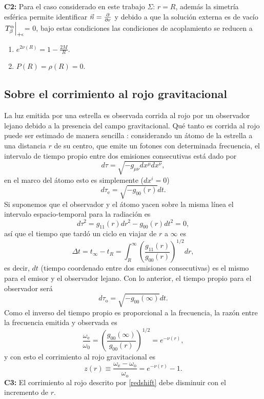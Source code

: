  \textbf{C2:} Para el caso considerado en este trabajo $\Sigma:\,r=R$, además la simetría esférica permite identificar $\vec{n}=\pdv{r}$ y debido a que la solución externa es de vacío $\eval{T^{\alpha}_{\beta}}_{+\epsilon}$= 0, bajo estas condiciones las condiciones de acoplamiento se reducen a
 \begin{enumerate}[leftmargin=2cm]
     \item $e ^ {  2 \nu(R) } =  1 - \frac { 2 M } { R }$.
    \item $P(R)=\rho(R)=0$.
 \end{enumerate}


\subsection*{ Sobre el corrimiento al rojo gravitacional}
La luz emitida por una estrella es observada corrida al rojo por un observador lejano debido a la presencia del campo gravitacional. Qué tanto es corrida al rojo puede ser estimado de manera sencilla \cite{Glendenning2000}: considerando un átomo de la estrella a una distancia $r$ de su centro, que emite un fotones con determinada frecuencia, el intervalo de tiempo propio entre dos emisiones consecutivas está dado por
\begin{equation}
d \tau=\sqrt{-g_{\mu \nu} d x^{\mu} d x^{\nu}},
\end{equation}
en el marco del átomo esto es simplemente ($dx^i=0$)
\begin{equation}
d \tau_{\mathrm{e}}=\sqrt{-g_{00}(r)} d t.
\end{equation}
Si suponemos que el observador y el átomo yacen sobre la misma línea el intervalo espacio-temporal para la radiación es
\begin{equation}
d \tau^{2}=g_{11}(r) d r^{2} - g_{00}(r) d t^{2} = 0,
\end{equation}
así que el tiempo que tardó un ciclo en viajar de $r$ a $\infty$ es
\begin{equation}
\Delta t=t_{\infty}-t_{R}=\int_{R}^{\infty}\left(\frac{g_{11}(r)}{g_{00}(r)}\right)^{1 / 2} d r,
\end{equation}
es decir, $dt$ (tiempo coordenado entre dos emisiones consecutivas) es el mismo para el emisor y el observador lejano. Con lo anterior, el tiempo propio para el observador será
\begin{equation}
d \tau_{\mathrm{o}}=\sqrt{-g_{00}(\infty)} d t.
\end{equation}
Como el inverso del tiempo propio es proporcional a la frecuencia, la razón entre la frecuencia emitida y observada es
\begin{equation}
\frac{\omega_{\mathrm{e}}}{\omega_{\mathrm{0}}}=\left(\frac{g_{00}(\infty)}{g_{00}(r)}\right)^{1 / 2}=e^{-\nu(r)},
\end{equation}
y con esto el corrimiento al rojo gravitacional es
\begin{equation}
    z(r)\equiv \frac{\omega_{\mathrm{e}}-\omega_{\mathrm{o}}}{\omega_{\mathrm{o}}}  = e^{-\nu(r)}-1.
    \label{redshift}
\end{equation}
\textbf{C3:} El corrimiento al rojo descrito por \eqref{redshift} debe disminuir con el incremento de $r$.
